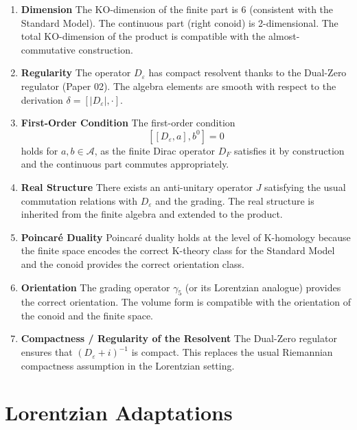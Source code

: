 \documentclass[11pt,a4paper]{article}
\begin{document}
\begin{enumerate}[label=\textbf{Axiom \arabic*.}]

\item \textbf{Dimension}  
The KO-dimension of the finite part is 6 (consistent with the Standard Model). The continuous part (right conoid) is 2-dimensional. The total KO-dimension of the product is compatible with the almost-commutative construction.

\item \textbf{Regularity}  
The operator \(D_\varepsilon\) has compact resolvent thanks to the Dual-Zero regulator (Paper 02). The algebra elements are smooth with respect to the derivation \(\delta = [|D_\varepsilon|, \cdot]\).

\item \textbf{First-Order Condition}  
The first-order condition
\[
[[D_\varepsilon, a], b^0] = 0
\]
holds for \(a, b \in \mathcal{A}\), as the finite Dirac operator \(D_F\) satisfies it by construction and the continuous part commutes appropriately.

\item \textbf{Real Structure}  
There exists an anti-unitary operator \(J\) satisfying the usual commutation relations with \(D_\varepsilon\) and the grading. The real structure is inherited from the finite algebra and extended to the product.

\item \textbf{Poincaré Duality}  
Poincaré duality holds at the level of K-homology because the finite space encodes the correct K-theory class for the Standard Model and the conoid provides the correct orientation class.

\item \textbf{Orientation}  
The grading operator \(\gamma_5\) (or its Lorentzian analogue) provides the correct orientation. The volume form is compatible with the orientation of the conoid and the finite space.

\item \textbf{Compactness / Regularity of the Resolvent}  
The Dual-Zero regulator ensures that \((D_\varepsilon + i)^{-1}\) is compact. This replaces the usual Riemannian compactness assumption in the Lorentzian setting.

\end{enumerate}

\section{Lorentzian Adaptations}
\end{document}
